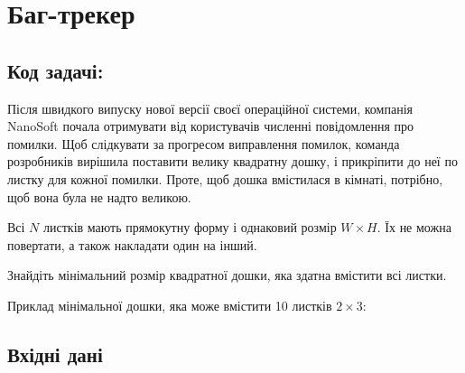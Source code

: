 \documentclass[12pt,a4paper]{article}
\begin{document}
\section*{Баг-трекер \hfill {}}


\subsection*{Код задачі: }

Після швидкого випуску нової версії своєї операційної системи, компанія NanoSoft почала отримувати від користувачів численні повідомлення про помилки.
Щоб слідкувати за прогресом виправлення помилок, команда розробників вирішила поставити велику квадратну дошку, і прикріпити до неї по листку для кожної помилки.
Проте, щоб дошка вмістилася в кімнаті, потрібно, щоб вона була не надто великою.

Всі \(N\) листків мають прямокутну форму і однаковий розмір \(W \times H\). Їх не можна повертати, а також накладати один на інший.

Знайдіть мінімальний розмір квадратної дошки, яка здатна вмістити всі листки.

Приклад мінімальної дошки, яка може вмістити 10 листків \(2 \times 3\):

\begin{center}
\end{center}


\subsection*{Вхідні дані}
\end{document}
